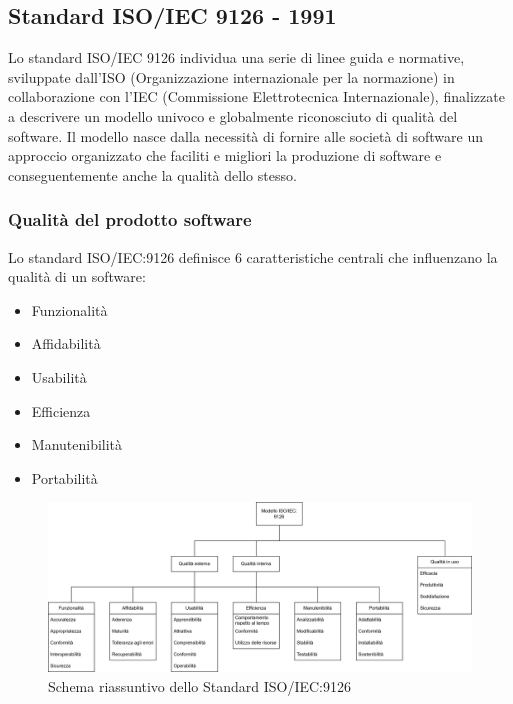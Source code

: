 \documentclass[10pt]{article}
\begin{document}
\begin{justify}
    \subsection{Standard ISO/IEC 9126 - 1991}
    \label{standard_9126}
    Lo standard ISO/IEC 9126 individua una serie di linee guida e normative, sviluppate dall'ISO (Organizzazione 
    internazionale per la normazione) in collaborazione con l'IEC (Commissione Elettrotecnica Internazionale), finalizzate 
    a descrivere un modello univoco e globalmente riconosciuto di qualità del software. Il modello nasce dalla necessità di
    fornire alle società di software un approccio organizzato che faciliti e migliori la produzione di software e conseguentemente 
    anche la qualità dello stesso.

        \subsubsection{Qualità del prodotto software}
        Lo standard ISO/IEC:9126 definisce 6 caratteristiche centrali che influenzano la qualità di un software:
        \begin{itemize}
            \item Funzionalità
            \item Affidabilità
            \item Usabilità
            \item Efficienza
            \item Manutenibilità
            \item Portabilità
        \end{itemize}

        \begin{figure}[H]
        \centering
        \includegraphics[width=1\textwidth]{Standard9126.png}
        \caption{Schema riassuntivo dello Standard ISO/IEC:9126}
        \end{figure}


\end{justify}
\end{document}
